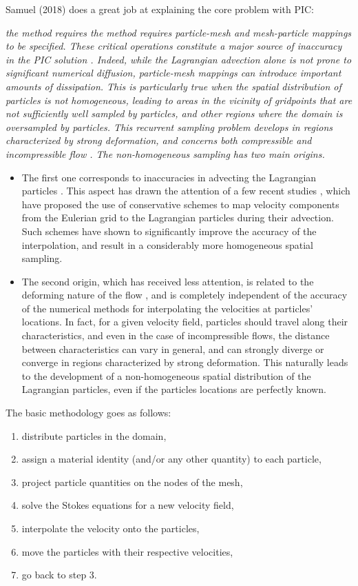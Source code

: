 Samuel (2018) \cite{samu18} does a great job at explaining 
the core problem with PIC: {\it the method requires the method requires particle-mesh 
and mesh-particle mappings to be specified. These critical operations constitute a
major source of inaccuracy in the PIC solution \cite{mona85,dumg11,thmk14}. 
Indeed, while the Lagrangian advection alone is not prone
to significant numerical diffusion, particle-mesh mappings can introduce 
important amounts of dissipation. This is particularly true
when the spatial distribution of particles is not homogeneous, leading 
to areas in the vicinity of gridpoints that are not sufficiently
well sampled by particles, and other regions where the domain is
oversampled by particles. This recurrent sampling problem develops 
in regions characterized by strong deformation, and concerns
both compressible and incompressible flow \cite{waav15,pukp16}. 
The non-homogeneous sampling has two main origins. 
\begin{itemize}
\item The first one corresponds to inaccuracies in advecting the
Lagrangian particles \cite{meje04}. This aspect has drawn
the attention of a few recent studies \cite{waav15,pukp16}, 
which have proposed the use of conservative schemes to
map velocity components from the Eulerian grid to the Lagrangian
particles during their advection. Such schemes have shown to significantly 
improve the accuracy of the interpolation, and result in
a considerably more homogeneous spatial sampling. \\
\item The second origin, which has received less attention, is related to the deforming
nature of the flow \cite{modm03}, and is completely independent 
of the accuracy of the numerical methods for interpolating
the velocities at particles' locations. In fact, for a given velocity
field, particles should travel along their characteristics, and even in
the case of incompressible flows, the distance between characteristics 
can vary in general, and can strongly diverge or converge in
regions characterized by strong deformation. This naturally leads to
the development of a non-homogeneous spatial distribution of the
Lagrangian particles, even if the particles locations are perfectly
known.
\end{itemize}
}


The basic methodology goes as follows:
\begin{enumerate}
\item distribute particles in the domain,
\item assign a material identity (and/or any other quantity) to each particle,
\item project particle quantities on the  nodes of the mesh,
\item solve the Stokes equations for a new velocity field,
\item interpolate the velocity onto the particles,
\item move the particles with their respective velocities, 
\item go back to step 3.
\end{enumerate}  

